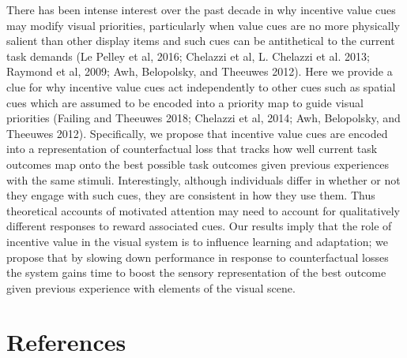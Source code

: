 \documentclass[11pt,halfline,a4paper,]{ouparticle}
\begin{document}
There has been intense interest over the past decade in why incentive value cues may modify visual priorities, particularly when value cues are no more physically salient than other display items and such cues can be antithetical to the current task demands (Le Pelley et al, 2016; Chelazzi et al, L. Chelazzi et al. 2013; Raymond et al, 2009; Awh, Belopolsky, and Theeuwes 2012). Here we provide a clue for why incentive value cues act independently to other cues such as spatial cues which are assumed to be encoded into a priority map to guide visual priorities (Failing and Theeuwes 2018; Chelazzi et al, 2014; Awh, Belopolsky, and Theeuwes 2012). Specifically, we propose that incentive value cues are encoded into a representation of counterfactual loss that tracks how well current task outcomes map onto the best possible task outcomes given previous experiences with the same stimuli. Interestingly, although individuals differ in whether or not they engage with such cues, they are consistent in how they use them. Thus theoretical accounts of motivated attention may need to account for qualitatively different responses to reward associated cues. Our results imply that the role of incentive value in the visual system is to influence learning and adaptation; we propose that by slowing down performance in response to counterfactual losses the system gains time to boost the sensory representation of the best outcome given previous experience with elements of the visual scene.

\hypertarget{references}{%
\section{References}\label{references}}

\label{sec:refs}
\end{document}
